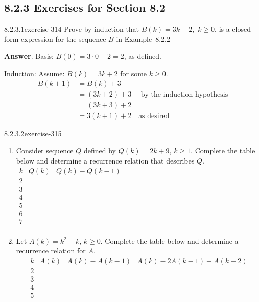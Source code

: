 \documentclass[twoside,10pt,]{book}
\numberwithin{equation}{section}
\begin{document}
\subsection*{8.2.3 Exercises for Section 8.2}
\begin{divisionsolution}{8.2.3.1}{}{exercise-314}%
\hypertarget{p-2600}{}%
Prove by induction that \(B(k) = 3k + 2,\) \(k\geq 0\), is a closed form expression for the sequence \(B\) in Example~8.2.2%
\par\smallskip%
\noindent\textbf{Answer}.\quad%
\hypertarget{p-2601}{}%
Basis: \(B(0)=3\cdot 0+2=2\), as defined.%
\par
\hypertarget{p-2602}{}%
Induction: Assume: \(B(k)=3k+2\) for some \(k\geq 0\).%
\begin{equation*}
\begin{split}
B(k+1) &=B(k)+3\\
&=(3k+2)+3\quad \textrm{ by the induction hypothesis} \\
&=(3k+3)+2\\
&=3(k+1)+2\quad \textrm{as desired}
\end{split}
\end{equation*}
%
\end{divisionsolution}%
\begin{divisionsolution}{8.2.3.2}{}{exercise-315}%
\hypertarget{p-2603}{}%
\leavevmode%
\begin{enumerate}[label=(\alph*)]
\item\hypertarget{li-1298}{}\hypertarget{p-2604}{}%
Consider sequence \(Q\) defined by \(Q(k) = 2k + 9\), \(k \geq  1\). Complete the table below and determine a recurrence relation that describes \(Q\). \(\begin{array}{c|c|c}
k & Q(k)  & Q(k)-Q(k-1) \\
\hline
2 &   &   \\
3 &   &   \\
4 & \text{  } &   \\
5 &   &   \\
6 &   &   \\
7 &   &   \\
\end{array}\)%
\item\hypertarget{li-1299}{}\hypertarget{p-2605}{}%
Let \(A(k) = k^2 - k\), \(k \geq  0\). Complete the table below and determine a recurrence relation for \(A\).%
\begin{equation*}
\begin{array}{c|c|c|c}
k & A(k) & A(k)-A(k-1) & A(k)-2A(k-1)+A(k-2) \\
\hline
2 &   &   &   \\
3 &   &   &   \\
4 &   &   &   \\
5 &   &   &   \\
\end{array}
\end{equation*}
%
\end{enumerate}
%
\end{divisionsolution}%
\end{document}
